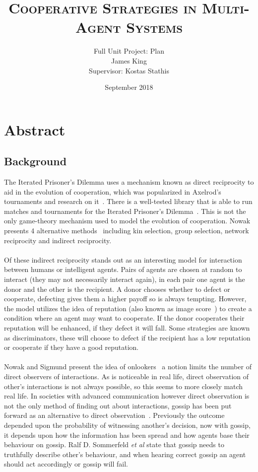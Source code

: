 \documentclass{article}
\title{\textsc{Cooperative Strategies in Multi-Agent Systems}}
\author{Full Unit Project: Plan\\James King\\Supervisor: Kostas Stathis}
\date{September 2018}
\begin{document}
\maketitle

\section*{Abstract}

\subsection*{Background}
The Iterated Prisoner's Dilemma uses a mechanism known as direct reciprocity to aid in the evolution of cooperation, which was popularized in Axelrod's tournaments and research on it~\cite{evolution_of_cooperation}. There is a well-tested library that is able to run matches and tournaments for the Iterated Prisoner's Dilemma~\cite{axelrodproject}. This is not the only game-theory mechanism used to model the evolution of cooperation. Nowak presents 4 alternative methods~\cite{five_rules_coop} including kin selection, group selection, network reciprocity and indirect reciprocity.\\\\
Of these indirect reciprocity stands out as an interesting model for interaction between humans or intelligent agents. Pairs of agents are chosen at random to interact (they may not necessarily interact again), in each pair one agent is the donor and the other is the recipient. A donor chooses whether to defect or cooperate, defecting gives them a higher payoff so is always tempting. However, the model utilizes the idea of reputation (also known as image score~\cite{evol_indirect_image}) to create a condition where an agent may want to cooperate. If the donor cooperates their reputation will be enhanced, if they defect it will fall. Some strategies are known as discriminators, these will choose to defect if the recipient has a low reputation or cooperate if they have a good reputation.\\\\
Nowak and Sigmund present the idea of onlookers~\cite{evol_indirect_image} a notion limits the number of direct observers of interactions. As is noticeable in real life, direct observation of other's interactions is not always possible, so this seems to more closely match real life. In societies with advanced communication however direct observation is not the only method of finding out about interactions, gossip has been put forward as an alternative to direct observation~\cite{gossip_alt}. Previously the outcome depended upon the probability of witnessing another's decision, now with gossip, it depends upon how the information has been spread and how agents base their behaviour on gossip. Ralf D. Sommerfeld \textit{et al} state that gossip needs to truthfully describe other's behaviour, and when hearing correct gossip an agent should act accordingly or gossip will fail.\\\\
\end{document}
